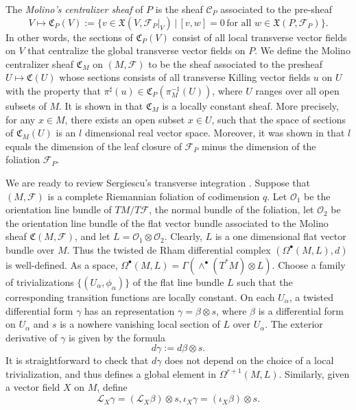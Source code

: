 \documentclass[reqno, 11pt]{amsart}
\theoremstyle{definition}
\theoremstyle{property}
\theoremstyle{remark}
\numberwithin{equation}{section}
\begin{document}
The \emph{Molino's centralizer sheaf} of $P$ is the sheaf $\mathcal{C}_P$ associated to the pre-sheaf 
\[ V\mapsto \mathfrak{C}_P(V):=\{v\in \mathfrak{X}(V, \mathcal{F}_P\vert_V)\,\vert\, [v, w]=0\, \text{for all $w\in \mathfrak{X}(P, \mathcal{F}_P)$}\}.
\]
In other words, the sections of $\mathfrak{C}_P(V)$ consist of all local transverse vector fields on $V$ that centralize the global transverse vector fields on $P$. We define the Molino centralizer sheaf $\mathfrak{C}_M$ on $(M, \mathcal{F})$ to be the sheaf associated to the presheaf  
$U \mapsto \mathfrak{C}(U)$ whose sections consists of all transverse Killing vector fields $u$ on $U$ with the property that
$\pi^{\sharp}(u) \in \mathfrak{C}_P(\pi_M^{-1}(U))$, where $U$ ranges over all open subsets of $M$. It is shown in \cite{Mo88} that $\mathfrak{C}_M$ is a locally constant sheaf. More precisely, for any $x\in M$, there exists an open subset $x\in U$, such that the space of sections of $\mathfrak{C}_M(U)$ is an $l$ dimensional real vector space. Moreover, it was shown in \cite{Mo88} that $l$ equals the dimension of the leaf closure of $\mathcal{F}_P$ minus the dimension of the foliation $\mathcal{F}_P$. 



We are ready to review Sergiescu's transverse integration \cite{Ser85}. Suppose that $(M, \mathcal{F})$ is a complete Riemannian foliation of codimension $q$. Let $\mathcal{O}_1$ be the orientation line bundle of $TM/T\mathcal{F}$, the normal bundle of the foliation, let $\mathcal{O}_2$ be the orientation line bundle of the flat vector bundle associated to the Molino sheaf $\mathfrak{C}(M, \mathcal{F})$, and let $L=\mathcal{O}_1\otimes \mathcal{O}_2$. Clearly, $L$ is a one dimensional flat vector bundle over $M$. Thus the twisted de Rham differential complex $(\Omega^\bullet(M, L), d)$ is well-defined. As a space, $\Omega^\bullet(M, L)=\Gamma(\wedge^\bullet(T^*M)\otimes L)$.
Choose a family of trivializations $\{(U_{\alpha},\phi_{\alpha})\}$ of the flat line bundle $L$ such
that the corresponding transition functions are locally constant. On each
$U_{\alpha}$, a twisted differential form $\gamma$ has an representation $\gamma= \beta \otimes s$,
where $\beta$ is a differential form on $U_{\alpha}$ and $s$ is a nowhere vanishing local
section of $L$ over $U_{\alpha}$. The exterior derivative of $\gamma$ is given by the formula
\[ d\gamma:= d\beta \otimes s. \]
It is straightforward to check that $d\gamma$ does not depend on the choice of
a local trivialization, and thus defines a global element in $\Omega^{r+1}(M,L)$.
Similarly, given a vector field $X$ on $M$, define
\begin{equation} \label{Lie-derivative} \mathcal{L}_X\gamma = (\mathcal{L}_X\beta )\otimes s, \iota_{X}\gamma= (\iota_X \beta )\otimes s.\end{equation}
\end{document}

